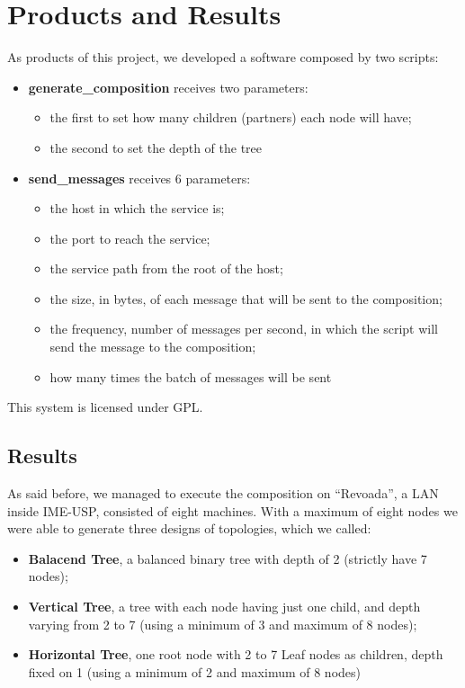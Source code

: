 \section{Products and Results}

As products of this project, we developed a software composed by two scripts:
\begin{itemize}
	\item \textbf{generate\_composition} receives two parameters:
	\begin{itemize}
		\item the first to set how many children (partners) each node will have;
		\item the second to set the depth of the tree
	\end{itemize}
	\item \textbf{send\_messages} receives 6 parameters:
	\begin{itemize}
		\item the host in which the service is;
		\item the port to reach the service;
		\item the service path from the root of the host;
		\item the size, in bytes, of each message that will be sent to the composition;
		\item the frequency, number of messages per second, in which the script will send the message to the composition;
		\item how many times the batch of messages will be sent
	\end{itemize}
\end{itemize}

This system is licensed under GPL.

\subsection{Results}
As said before, we managed to execute the composition on ``Revoada'', a LAN inside IME-USP, consisted of eight machines. With a maximum of eight nodes we were able to generate three designs of topologies, which we called:

\begin{itemize}
	\item \textbf{Balacend Tree}, a balanced binary tree with depth of 2 (strictly have 7 nodes);
	\item \textbf{Vertical Tree}, a tree with each node having just one child, and depth varying from 2 to 7 (using a minimum of 3 and maximum of 8 nodes);
	\item \textbf{Horizontal Tree}, one root node with 2 to 7 Leaf nodes as children, depth fixed on 1 (using a minimum of 2 and maximum of 8 nodes)
\end{itemize}

